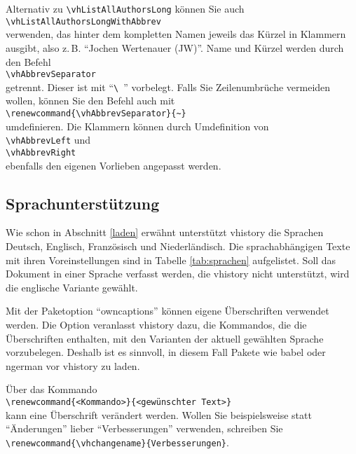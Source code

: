 Alternativ zu \verb|\vhListAllAuthorsLong| können Sie auch\\
\mbox{}\hspace{2em}\verb|\vhListAllAuthorsLongWithAbbrev|\\
verwenden, das hinter dem kompletten Namen jeweils das Kürzel in Klammern ausgibt, also z.\,B. "`Jochen Wertenauer (JW)"'. Name und Kürzel werden durch den Befehl\\
\mbox{}\hspace{2em}\verb|\vhAbbrevSeparator|\\
getrennt. Dieser ist mit "`\verb*|\ |"' vorbelegt. Falls Sie Zeilenumbrüche vermeiden wollen, können Sie den Befehl auch mit\\
\mbox{}\hspace{2em}\verb|\renewcommand{\vhAbbrevSeparator}{~}|\\
umdefinieren. Die Klammern können durch Umdefinition von\\
\mbox{}\hspace{2em}\verb|\vhAbbrevLeft| und\\
\mbox{}\hspace{2em}\verb|\vhAbbrevRight|\\
ebenfalls den eigenen Vorlieben angepasst werden.

\subsection{Sprachunterstützung}\label{sprachen}
Wie schon in Abschnitt \ref{laden} erwähnt unterstützt vhistory die Sprachen Deutsch, Englisch, Französisch und Niederländisch. Die sprachabhängigen Texte mit ihren Voreinstellungen sind in Tabelle \ref{tab:sprachen} aufgelistet. Soll das Dokument in einer Sprache verfasst werden, die vhistory nicht unterstützt, wird die englische Variante gewählt.

Mit der Paketoption "`owncaptions"' können eigene Überschriften verwendet werden. Die Option veranlasst vhistory dazu, die Kommandos, die die Überschriften enthalten, mit den Varianten der aktuell gewählten Sprache vorzubelegen. Deshalb ist es sinnvoll, in diesem Fall Pakete wie babel oder ngerman vor vhistory zu laden.

Über das Kommando\\
\mbox{}\hspace{2em}\verb|\renewcommand{<Kommando>}{<gewünschter Text>}|\\
kann eine Überschrift verändert werden. Wollen Sie beispielsweise statt "`Änderungen"' lieber "`Verbesserungen"' verwenden, schreiben Sie\\
\mbox{}\hspace{2em}\verb|\renewcommand{\vhchangename}{Verbesserungen}|.

